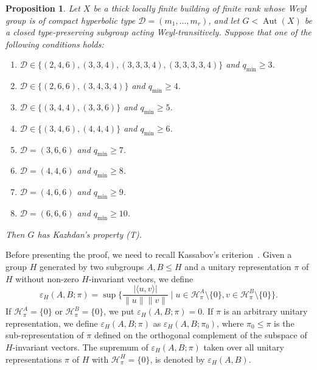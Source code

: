 \documentclass[12pt,a4paper]{amsproc}
\newtheorem{proposition}[theorem]{Proposition}
\theoremstyle{definition}
\DeclareMathOperator{\Aut}{Aut}
\newcommand{\qmin}{q_{\mathrm{min}}}
\begin{document}
\begin{proposition}\label{prop:Kazhdan}
Let $X$ be a thick locally finite building of finite rank whose Weyl group is of compact hyperbolic type   $\mathcal D = (m_1, \dots, m_r)$, and let $G<\Aut(X)$ be a closed type-preserving subgroup acting Weyl-transitively. Suppose that one of the following conditions holds:

\begin{enumerate}[label=(\arabic*)]
\item $\mathcal D \in \{(2, 4, 6), (3,3,4), (3, 3, 3, 4), (3, 3, 3, 3, 4)\}$ and $\qmin \geq 3$. 
\item $\mathcal D \in \{(2, 6, 6), (3, 4, 3,4)\}$ and $\qmin \geq 4$. 

\item $\mathcal D \in \{(3, 4, 4), (3,3,6)\}$ and $\qmin \geq 5$. 

\item $\mathcal D \in \{(3, 4, 6), (4,4,4)\}$ and $\qmin \geq 6$. 

\item $\mathcal D = (3,6,6)$ and $\qmin \geq 7$. 
\item $\mathcal D = (4, 4, 6)$   and $\qmin \geq 8$. 

\item $\mathcal D = (4,6,6)$ and $\qmin \geq 9$. 

\item $\mathcal D = (6,6,6)$ and $\qmin \geq 10$. 
\end{enumerate}
	
Then $G$ has Kazhdan's property (T). 
\end{proposition}

Before presenting the proof, we need to recall Kassabov's criterion~\cite{Ka11}. 
Given a group $H$ generated by two subgroups $A, B \leq H$ 
 and a unitary representation $\pi$ of $H$ without non-zero $H$-invariant vectors, we define
$$\varepsilon_H(A, B; \pi) = \sup\big\{\frac{|\langle u, v \rangle |}{\| u \| \| v \|} \mid u \in \mathcal H_\pi^A \setminus \{0\}, v \in \mathcal H_\pi^B \setminus \{0\}\big\}.
$$
 If $\mathcal H_\pi^A = \{0\}$ or $\mathcal H_\pi^B = \{0\}$, we put $\varepsilon_H(A, B; \pi) =0$. If $\pi$ is an arbitrary unitary representation, we define  $\varepsilon_H(A, B; \pi)$ as $\varepsilon_H(A, B;\pi_0)$, where $\pi_0 \leq \pi$ is the sub-representation of $\pi$ defined on the orthogonal complement of the subspace of $H$-invariant vectors. 
The supremum of $\varepsilon_H(A, B; \pi) $ taken over all unitary representations $\pi$ of $H$ with $\mathcal H_\pi^H = \{0\}$, is denoted by 
$\varepsilon_H(A, B).$
\end{document}

